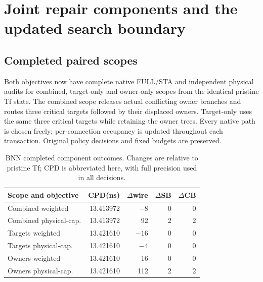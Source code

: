 
\section{Joint repair components and the updated search boundary}
\subsection{Completed paired scopes}
Both objectives now have complete native FULL/STA and independent physical audits for combined, target-only and owner-only scopes from the identical pristine Tf state. The combined scope releases actual conflicting owner branches and routes three critical targets followed by their displaced owners. Target-only uses the same three critical targets while retaining the owner trees. Every native path is chosen freely; per-connection occupancy is updated throughout each transaction. Original policy decisions and fixed budgets are preserved.

\begin{table}[t]
\centering\small
\caption{BNN completed component outcomes. Changes are relative to pristine Tf; CPD is abbreviated here, with full precision used in all decisions.}
\begin{tabular}{lrrrr}
\hline
Scope and objective & CPD(ns) & $\Delta$wire & $\Delta$SB & $\Delta$CB\\
\hline
Combined weighted & 13.413972 & $-8$ & 0 & 0\\
Combined physical-cap. & 13.413972 & 92 & 2 & 2\\
Targets weighted & 13.421610 & $-16$ & 0 & 0\\
Targets physical-cap. & 13.421610 & $-4$ & 0 & 0\\
Owners weighted & 13.421610 & 16 & 0 & 0\\
Owners physical-cap. & 13.421610 & 112 & 2 & 2\\
\hline
\end{tabular}
\end{table}

